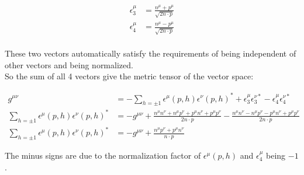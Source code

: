 \documentclass[11pt]{article}
\begin{document}
\begin{itemize}
    \begin{align}
        \epsilon_3^\mu & = \frac{n^\mu + p^\mu}{\sqrt{2n\cdot p}}\\
        \epsilon_4^\mu & = \frac{n^\mu - p^\mu}{\sqrt{2n\cdot p}}\\
    \end{align}
    
    These two vectors automatically satisfy the requirements of being independent of other vectors and being normalized.\\
    
    So the sum of all 4 vectors give the metric tensor of the vector space:
    
    \begin{align*}
        g^{\mu\nu} & = -\sum_{h=\pm 1} \epsilon^\mu(p,h)\epsilon^\nu(p,h)^* + \epsilon^\mu_3 \epsilon^{\nu*}_3 - \epsilon^\mu_4 \epsilon^{\nu*}_4 \\
        \sum_{h=\pm 1} \epsilon^\mu(p,h)\epsilon^\nu(p,h)^* & = -g^{\mu\nu} + \frac{n^\mu n^{\nu} + n^\mu p^\nu + p^\mu n^{\nu} + p^\mu p^\nu}{2n\cdot p} - \frac{n^\mu n^{\nu} - n^\mu p^\nu - p^\mu n^{\nu} + p^\mu p^\nu}{2n\cdot p}\\
        \sum_{h=\pm 1} \epsilon^\mu(p,h)\epsilon^\nu(p,h)^* & = -g^{\mu\nu} + \frac{n^\mu p^\nu + p^\mu n^{\nu}}{n\cdot p}
    \end{align*}
    
    The minus signs are due to the normalization factor of $\epsilon^\mu(p,h)$ and $\epsilon^\mu_4$ being $-1$.
    
    
\end{itemize}
\end{document}
